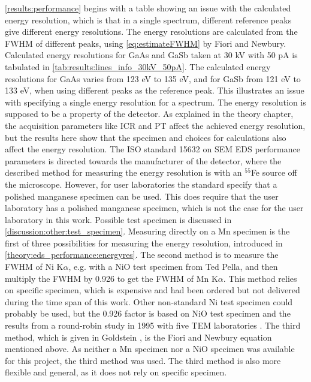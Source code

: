 \cref{results:performance} begins with a table showing an issue with the calculated energy resolution, which is that in a single spectrum, different reference peaks give different energy resolutions.
The energy resolutions are calculated from the FWHM of different peaks, using \cref{eq:estimateFWHM} by Fiori and Newbury.
Calculated energy resolutions for GaAs and GaSb taken at 30 kV with 50 pA is tabulated in \cref{tab:results:lines_info_30kV_50pA}.
The calculated energy resolutions for GaAs varies from 123 eV to 135 eV, and for GaSb from 121 eV to 133 eV,  when using different peaks as the reference peak.
This illustrates an issue with specifying a single energy resolution for a spectrum.
The energy resolution is supposed to be a property of the detector.
As explained in the theory chapter, the acquisition parameters like ICR and PT affect the achieved energy resolution, but the results here show that the specimen and choices for calculations also affect the energy resolution.
The ISO standard 15632 \cite{iso_qc_15632} on SEM EDS performance parameters is directed towards the manufacturer of the detector, where the described method for measuring the energy resolution is with an $^{55}$Fe source off the microscope.
However, for user laboratories the standard specify that a polished manganese specimen can be used.
This does require that the user laboratory has a polished manganese specimen, which is not the case for the user laboratory in this work.
Possible test specimen is discussed in \cref{discussion:other:test_specimen}.
Measuring directly on a Mn specimen is the first of three possibilities for measuring the energy resolution, introduced in \cref{theory:eds_performance:energyres}.
The second method is to measure the FWHM of Ni K$\alpha$, e.g. with a NiO test specimen from Ted Pella, and then multiply the FWHM by 0.926 to get the FWHM of Mn K$\alpha$.
This method relies on specific specimen, which is expensive and had been ordered but not delivered during the time span of this work.
Other non-standard Ni test specimen could probably be used, but the 0.926 factor is based on NiO test specimen and the results from a round-robin study in 1995 with five TEM laboratories \cite{bennett_egerton_1995}.
The third method, which is given in Goldstein \cite{goldstein_scanning_2018}, is the Fiori and Newbury equation mentioned above.
As neither a Mn specimen nor a NiO specimen was available for this project, the third method was used.
The third method is also more flexible and general, as it does not rely on specific specimen.


